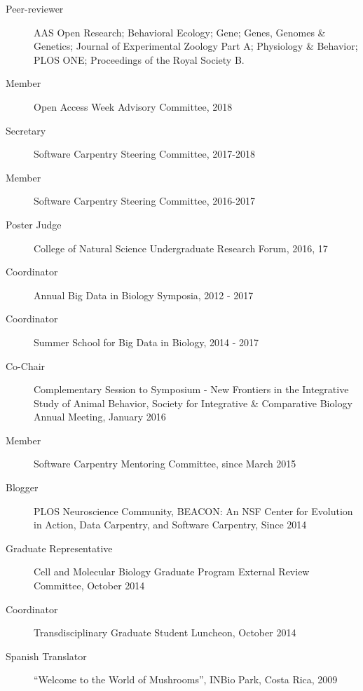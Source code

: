 \documentclass[margin,line]{CV}
\begin{document}
\begin{resume}
\begin{description}
\item[Peer-reviewer] AAS Open Research; Behavioral Ecology; Gene; Genes, Genomes \& Genetics; Journal of Experimental Zoology Part A; Physiology \& Behavior; PLOS ONE; Proceedings of the Royal Society B. 
\item[Member] Open Access Week Advisory Committee, 2018
\item[Secretary] Software Carpentry Steering Committee, 2017-2018
\item[Member] Software Carpentry Steering Committee, 2016-2017
\item[Poster Judge] College of Natural Science Undergraduate Research Forum, 2016, 17
\item[Coordinator] Annual Big Data in Biology Symposia, 2012 - 2017 
\item[Coordinator] Summer School for Big Data in Biology, 2014 - 2017
\item[Co-Chair] Complementary Session to Symposium - New Frontiers in the Integrative Study of Animal Behavior, Society for Integrative \& Comparative Biology Annual Meeting, January 2016
\item[Member] Software Carpentry Mentoring Committee, since March 2015
\item[Blogger] PLOS Neuroscience Community, BEACON: An NSF Center for Evolution in Action, Data Carpentry, and Software Carpentry, Since 2014
\item[Graduate Representative] Cell and Molecular Biology Graduate Program External Review Committee, October 2014 
\item[Coordinator] Transdisciplinary Graduate Student Luncheon, October 2014
\item[Spanish Translator] “Welcome to the World of Mushrooms”, INBio Park, Costa Rica, 2009
\end{description}

    

\end{resume}
\end{document}

